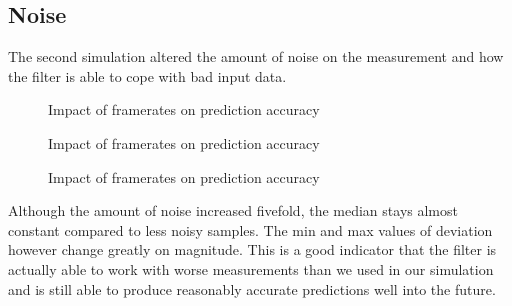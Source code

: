 \documentclass[notitlepage, a4paper, 11pt]{scrartcl}
\begin{document}
\begin{multicols}{2}
\subsection{Noise}

The second simulation altered the amount of noise on the measurement and how the filter is able to cope with bad input data.

\begin{figure}[H]
    \centering
    \caption{Impact of framerates on prediction accuracy}
    \label{fig:noise2}
\end{figure}

\begin{figure}[H]
    \centering
    \caption{Impact of framerates on prediction accuracy}
    \label{fig:noise5}
\end{figure}

\begin{figure}[H]
    \centering
    \caption{Impact of framerates on prediction accuracy}
    \label{fig:noise10}
\end{figure}

Although the amount of noise increased fivefold, the median stays almost constant compared to less noisy samples. The min and max values of deviation however change greatly on magnitude.
This is a good indicator that the filter is actually able to work with worse measurements than we used in our simulation and is still able to produce reasonably accurate predictions well into the future.


\end{multicols}
\end{document}

